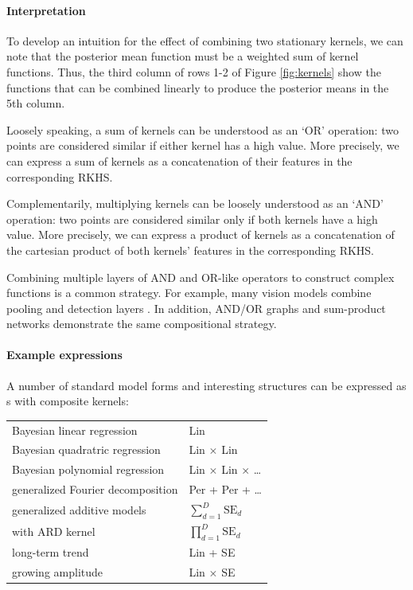 \documentclass[twoside]{article}
\begin{document}

\paragraph{Interpretation}

To develop an intuition for the effect of combining two stationary kernels, we can note that the posterior mean function must be a weighted sum of kernel functions.  Thus, the third column of rows 1-2 of Figure \ref{fig:kernels} show the functions that can be combined linearly to produce the posterior means in the 5th column.

Loosely speaking, a sum of kernels can be understood as an `OR' operation: two points are considered similar if either kernel has a high value.
More precisely, we can express a sum of kernels as a concatenation of their features in the corresponding RKHS.

Complementarily, multiplying kernels can be loosely understood as an `AND' operation: two points are considered similar only if both kernels have a high value.
More precisely, we can express a product of kernels as a concatenation of the cartesian product of both kernels' features in the corresponding RKHS.

Combining multiple layers of AND and OR-like operators to construct complex functions is a common strategy.  For example, many vision models combine pooling and detection layers . In addition, AND/OR graphs  and sum-product networks  demonstrate the same compositional strategy.


\paragraph{Example expressions}

A number of standard model forms and interesting structures can be expressed as \gp s with composite kernels:

\begin{tabular}{l|l}
Bayesian linear regression & Lin \\
Bayesian quadratric regression & Lin $\times$ Lin \\
Bayesian polynomial regression & Lin $\times$ Lin $\times$ \dots\\
generalized Fourier decomposition & Per + Per + \dots \\
generalized additive models & $\sum_{d=1}^D \textrm{SE}_d$ \\
\gp{} with ARD kernel & $\prod_{d=1}^D \textrm{SE}_d$ \\
long-term trend & Lin + SE \\
growing amplitude & Lin $\times$ SE
\end{tabular}
\end{document}
